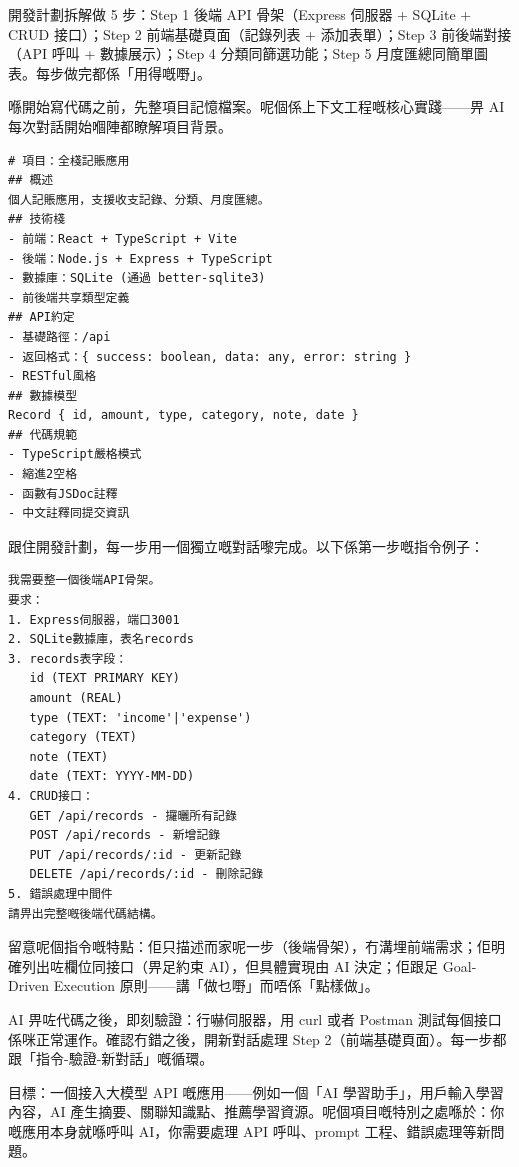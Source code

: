 開發計劃拆解做 5 步：Step 1 後端 API 骨架（Express 伺服器 + SQLite + CRUD 接口）；Step 2 前端基礎頁面（記錄列表 + 添加表單）；Step 3 前後端對接（API 呼叫 + 數據展示）；Step 4 分類同篩選功能；Step 5 月度匯總同簡單圖表。每步做完都係「用得嘅嘢」。


喺開始寫代碼之前，先整項目記憶檔案。呢個係上下文工程嘅核心實踐——畀 AI 每次對話開始嗰陣都瞭解項目背景。

\begin{lstlisting}
# 項目：全棧記賬應用
## 概述
個人記賬應用，支援收支記錄、分類、月度匯總。
## 技術棧
- 前端：React + TypeScript + Vite
- 後端：Node.js + Express + TypeScript
- 數據庫：SQLite (通過 better-sqlite3)
- 前後端共享類型定義
## API約定
- 基礎路徑：/api
- 返回格式：{ success: boolean, data: any, error: string }
- RESTful風格
## 數據模型
Record { id, amount, type, category, note, date }
## 代碼規範
- TypeScript嚴格模式
- 縮進2空格
- 函數有JSDoc註釋
- 中文註釋同提交資訊
\end{lstlisting}


跟住開發計劃，每一步用一個獨立嘅對話嚟完成。以下係第一步嘅指令例子：

\begin{lstlisting}
我需要整一個後端API骨架。
要求：
1. Express伺服器，端口3001
2. SQLite數據庫，表名records
3. records表字段：
   id (TEXT PRIMARY KEY)
   amount (REAL)
   type (TEXT: 'income'|'expense')
   category (TEXT)
   note (TEXT)
   date (TEXT: YYYY-MM-DD)
4. CRUD接口：
   GET /api/records - 攞曬所有記錄
   POST /api/records - 新增記錄
   PUT /api/records/:id - 更新記錄
   DELETE /api/records/:id - 刪除記錄
5. 錯誤處理中間件
請畀出完整嘅後端代碼結構。
\end{lstlisting}

留意呢個指令嘅特點：佢只描述而家呢一步（後端骨架），冇溝埋前端需求；佢明確列出咗欄位同接口（畀足約束 AI），但具體實現由 AI 決定；佢跟足 Goal-Driven Execution 原則——講「做乜嘢」而唔係「點樣做」。

AI 畀咗代碼之後，即刻驗證：行嚇伺服器，用 curl 或者 Postman 測試每個接口係咪正常運作。確認冇錯之後，開新對話處理 Step 2（前端基礎頁面）。每一步都跟「指令-驗證-新對話」嘅循環。



目標：一個接入大模型 API 嘅應用——例如一個「AI 學習助手」，用戶輸入學習內容，AI 產生摘要、關聯知識點、推薦學習資源。呢個項目嘅特別之處喺於：你嘅應用本身就喺呼叫 AI，你需要處理 API 呼叫、prompt 工程、錯誤處理等新問題。

